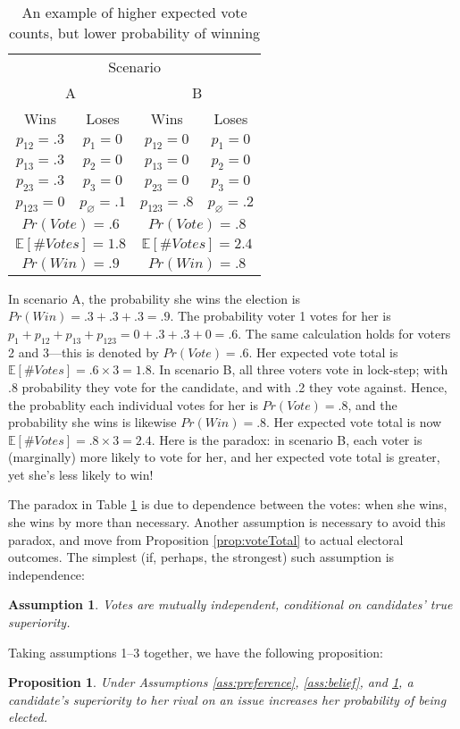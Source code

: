 \documentclass[11pt]{article}
\newtheorem{prop}{Proposition}
\newtheorem{ass}{Assumption}
\begin{document}
\begin{table}
\begin{tabular}{cc|cc}
\multicolumn{4}{c}{Scenario}\\
\multicolumn{2}{c}{A}&\multicolumn{2}{c}{B}\\
Wins&Loses&Wins&Loses\\
\hline
$p_{12}=.3$ & $p_1=0 $& $p_{12}=0$ & $p_1=0$\\
$p_{13}=.3$ & $p_2=0 $& $p_{13}=0$ & $p_2=0$\\
$p_{23}=.3$ & $p_3=0 $& $p_{23}=0$ & $p_3=0$\\
$p_{123}=0$ & $p_\varnothing=.1$& $p_{123}=.8$ & $p_\varnothing=.2$\\
\hline
\multicolumn{2}{c|}{$Pr(Vote)=.6$}&\multicolumn{2}{c}{$Pr(Vote)=.8$}\\
\multicolumn{2}{c|}{$\mathbb{E}[\# Votes]=1.8$}&\multicolumn{2}{c}{$\mathbb{E}[\# Votes]=2.4$}\\
\multicolumn{2}{c|}{$Pr(Win)=.9$}&\multicolumn{2}{c}{$Pr(Win)=.8$}\\
\hline
\end{tabular}
\caption{An example of higher expected vote counts, but lower
  probability of winning}
\label{tab:threeVoters}
\end{table}

In scenario A, the probability she wins the election is $Pr(Win)=.3+.3+.3=.9$.
The probability voter 1 votes for her is
$p_1+p_{12}+p_{13}+p_{123}=0+.3+.3+0=.6$. The same calculation holds
for voters 2 and 3---this is denoted by $Pr(Vote)=.6$.
Her expected vote total is $\mathbb{E}[\# Votes]=.6\times 3=1.8$.
In scenario B, all three voters vote in lock-step; with .8 probability
they vote for the candidate, and with .2 they vote against. 
Hence, the probablity each individual votes for her is $Pr(Vote)=.8$, and the
probability she wins is likewise $Pr(Win)=.8$.
Her expected vote total is now $\mathbb{E}[\# Votes]=.8\times 3=2.4$.
Here is the paradox: in scenario B, each voter is (marginally) more
likely to vote for her, and her expected vote total is greater, yet
she's less likely to win! 

The paradox in Table \ref{tab:threeVoters} is due to dependence
between the votes: when she wins, she wins by more than necessary.
Another assumption is necessary to avoid this paradox, and move from Proposition
\ref{prop:voteTotal} to actual electoral outcomes. 
The simplest (if, perhaps, the strongest) such assumption is independence:
\begin{ass}\label{ass:independent}
Votes are mutually independent, conditional on candidates' true superiority.
\end{ass}
Taking assumptions 1--3 together, we have the following proposition:
\begin{prop}\label{prop:main}
Under Assumptions \ref{ass:preference}, \ref{ass:belief}, and \ref{ass:independent},
a candidate's superiority to her rival on an issue increases her probability of being elected.
\end{prop}
\end{document}
